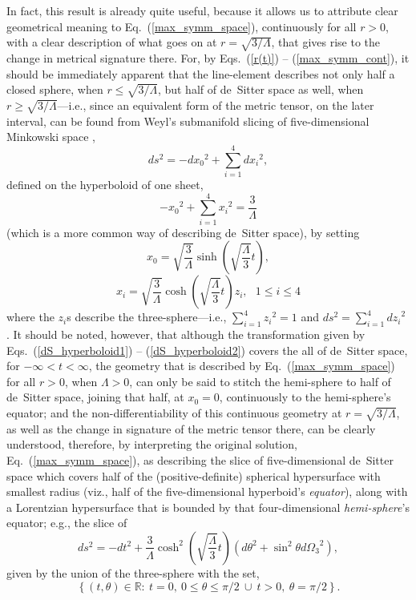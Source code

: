 In fact, this result is already quite useful, because it allows us to attribute clear geometrical meaning to Eq.~(\ref{max_symm_space}), continuously for all $r>0$, with a clear description of what goes on at $r=\sqrt{3/\Lambda}$, that gives rise to the change in metrical signature there. For, by Eqs.~(\ref{r(t)}) -- (\ref{max_symm_cont}), it should be immediately apparent that the line-element describes not only half a closed sphere, when $r\leq\sqrt{3/\Lambda}$, but half of de~Sitter space as well, when $r\geq\sqrt{3/\Lambda}$---i.e., since an equivalent form of the metric tensor, on the later interval, can be found from Weyl's submanifold slicing of five-dimensional Minkowski space \cite{Weyl1923,Weyl2009},
\begin{equation}
ds^2=-d{x_0}^2+\sum_{i=1}^{4}d{x_i}^2,\label{Lorentz_sphere1}
\end{equation}
defined on the hyperboloid of one sheet,
\begin{equation}
-{x_0}^2+\sum_{i=1}^{4}{x_i}^2=\frac{3}{\Lambda}\label{Lorentz_sphere2}
\end{equation}
(which is a more common way of describing de~Sitter space), by setting 
\begin{equation}
x_0=\sqrt{\frac{3}{\Lambda}}\sinh\left(\sqrt{\frac{\Lambda}{3}}t\right),\label{dS_hyperboloid1}
\end{equation}
\begin{equation}
x_i=\sqrt{\frac{3}{\Lambda}}\cosh\left(\sqrt{\frac{\Lambda}{3}}t\right)z_i,~~~1\leq{i}\leq4\label{dS_hyperboloid2}
\end{equation}
where the $z_i$s describe the three-sphere---i.e., $\sum_{i=1}^4{z_i}^2=1$ and $ds^2=\sum_{i=1}^4{dz_i}^2$ \cite{deSitter2012}. It should be noted, however, that although the transformation given by Eqs.~(\ref{dS_hyperboloid1}) -- (\ref{dS_hyperboloid2}) covers the all of de~Sitter space, for $-\infty<t<\infty$, the geometry that is described by Eq.~(\ref{max_symm_space}) for all $r>0$, when $\Lambda>0$, can only be said to stitch the hemi-sphere to half of de~Sitter space, joining that half, at $x_0=0$, continuously to the hemi-sphere's equator; and the non-differentiability of this continuous geometry at $r=\sqrt{3/\Lambda}$, as well as the change in signature of the metric tensor there, can be clearly understood, therefore, by interpreting the original solution, Eq.~(\ref{max_symm_space}), as describing the slice of five-dimensional de~Sitter space which covers half of the (positive-definite) spherical hypersurface with smallest radius (viz., half of the five-dimensional hyperboid's \textit{equator}), along with a Lorentzian hypersurface that is bounded by that four-dimensional \textit{hemi-sphere}'s equator; e.g., the slice of
\begin{equation}
ds^2=-dt^2+\frac{3}{\Lambda}\cosh^2\left(\sqrt{\frac{\Lambda}{3}}t\right)\left(d\theta^2+\sin^2\theta{d\Omega_3}^2\right),
\end{equation}
given by the union of the three-sphere with the set, 
\begin{equation}
\left\{(t,\theta)\in\mathbb{R}:\ t=0,~0\leq\theta\leq\pi/2~\cup~{t}>0,~\theta=\pi/2\right\}.
\end{equation} 

